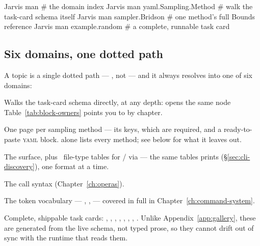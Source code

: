 \begin{terminal}
\begin{jcmd}
Jarvis man                        # the domain index
Jarvis man yaml.Sampling.Method   # walk the task-card schema itself
Jarvis man sampler.Bridson        # one method's full Bounds reference
Jarvis man example.random         # a complete, runnable task card
\end{jcmd}
\end{terminal}

\subsection{Six domains, one dotted path}

A topic is a single dotted path --- , not
 --- and it always resolves into one of six domains:

\begin{keylist}
  \item[yaml] Walks the task-card schema directly, at any depth:  opens the same node
        Table~\ref{tab:block-owners} points you to by chapter.
  \item[sampler] One page per sampling method --- its  keys, which are
        required, and a ready-to-paste \textsc{yaml} block. 
        alone lists every method; see below for what it leaves out.
  \item[calculator] The  surface, plus \Portal\ file-type
        tables for / via  ---
        the same tables  prints (\S\ref{sec:cli-discovery}), one
        format at a time.
  \item[operas] The  call syntax (Chapter~\ref{ch:operas}).
  \item[tokens] The token vocabulary --- , ,
         --- covered in full in Chapter~\ref{ch:command-system}.
  \item[example] Complete, shippable task cards: , ,
        , , , ,
        , . Unlike Appendix~\ref{app:gallery}, these
        are generated from the live schema, not typed prose, so they cannot drift out
        of sync with the runtime that reads them.
\end{keylist}


